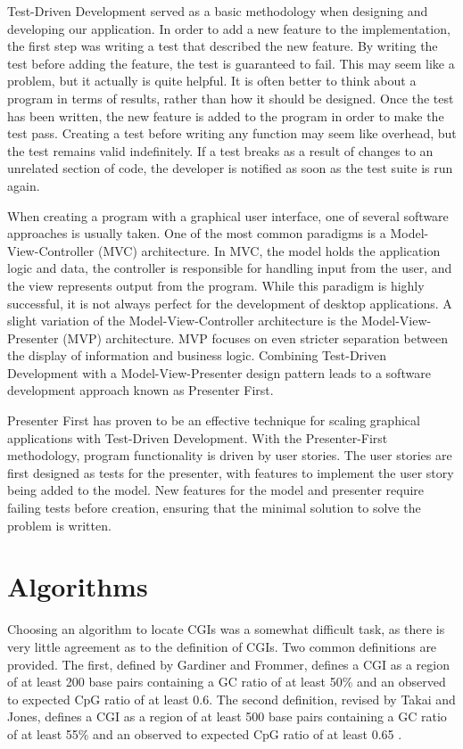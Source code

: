 \documentclass{bioinfo}
\begin{document}
Test-Driven Development served as a basic methodology when designing
and developing our application. In order to add a new feature to the
implementation, the first step was writing a test that described the
new feature. By writing the test before adding the feature, the test
is guaranteed to fail. This may seem like a problem, but it actually
is quite helpful. It is often better to think about a program in terms
of results, rather than how it should be designed. Once the test has
been written, the new feature is added to the program in order to make
the test pass. Creating a test before writing any function may seem like
overhead, but the test remains valid indefinitely. If a test breaks as
a result of changes to an unrelated section of code, the developer is
notified as soon as the test suite is run again.

When creating a program with a graphical user interface, one of
several software approaches is usually taken. One of the most common
paradigms is a Model-View-Controller (MVC) architecture. In MVC, the
model holds the application logic and data, the controller is
responsible for handling input from the user, and the view represents
output from the program. While this paradigm is highly successful, it
is not always perfect for the development of desktop applications. A
slight variation of the Model-View-Controller architecture is the
Model-View-Presenter (MVP) architecture. MVP focuses on even stricter
separation between the display of information and business
logic. Combining Test-Driven Development with a Model-View-Presenter
design pattern
leads to a software development approach known as Presenter First. 

Presenter First \citep{Alles:2006:PFO:1155439.1155482} has proven to
be an effective technique for scaling graphical applications with
Test-Driven Development. With the Presenter-First methodology, program
functionality is driven by user stories. The user stories are first
designed as tests for the presenter, with features to implement the
user story being added to the model. New features for the model and
presenter require failing tests before creation, ensuring that the
minimal solution to solve the problem is written.

\section{Algorithms}

Choosing an algorithm to locate CGIs was a somewhat difficult
task, as there is very little agreement as to the definition of
CGIs. Two common definitions are provided. The first, defined by
Gardiner and Frommer, defines a CGI as a region of at least 200 base
pairs containing a GC ratio of at least 50\% and an observed to
expected CpG ratio of at least 0.6. The second definition, revised by
Takai and Jones, defines a CGI as a region of at least 500 base pairs containing a GC ratio of at least 55\% and an observed to
expected CpG ratio of at least 0.65 \citep{pmid11891299}.
\end{document}
